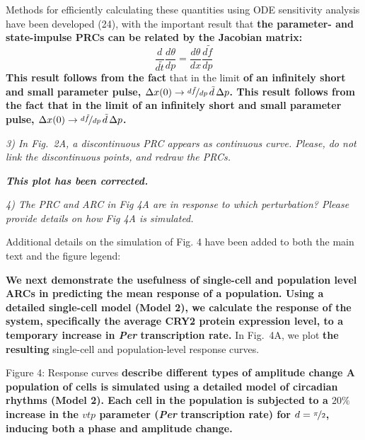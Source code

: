 \documentclass[11pt, letterpaper]{article}
\newenvironment{reviewer}{\itshape\color{gray}}{}
\newenvironment{manuscript}[1]{\begin{center}\begin{tcolorbox}[colback=green!5!white,colframe=green!75!black,width=0.8\textwidth,title={#1},breakable,fonttitle=\bfseries]}{\end{tcolorbox}\end{center}}
\begin{document}
\begin{manuscript}{Page 5}
  Methods for efficiently calculating these quantities using ODE sensitivity analysis have been developed (24), with the important result that {\bfseries the parameter- and state-impulse PRCs can be related by the Jacobian matrix:}
\begin{equation}
  \frac{d}{d\tilde{t}}\frac{d\theta}{dp} = \frac{d\theta}{dx}\frac{d\tilde{f}}{dp} 
  \tag{11}
\end{equation}
{\bfseries This result follows from the fact} that in the limit {\bfseries of an infinitely short and small parameter pulse, $\Delta x(0) \to \nicefrac{d\tilde{f}}{dp}\,\tilde{d}\, \Delta p$.
This result follows from the fact that in the limit of an infinitely short and small parameter pulse, $\Delta x(0) \to \nicefrac{d\tilde{f}}{dp}\,\tilde{d}\, \Delta p$.}
\end{manuscript}

\begin{reviewer}
3) In Fig.~2A, a discontinuous PRC appears as continuous curve.
Please, do not link the discontinuous points, and redraw the PRCs.
\end{reviewer}

{\bfseries\itshape This plot has been corrected.}

\begin{reviewer}
4) The PRC and ARC in Fig 4A are in response to which perturbation?
Please provide details on how Fig 4A is simulated.
\end{reviewer}

Additional details on the simulation of Fig. 4 have been added to both the main text and the figure legend:

\begin{manuscript}{Page 14}
{\bfseries We next demonstrate the usefulness of single-cell and population level ARCs in predicting the mean response of a population.
  Using a detailed single-cell model (Model 2), we calculate the response of the system, specifically the average CRY2 protein expression level, to a temporary increase in {\itshape Per} transcription rate.}
In Fig.~4A, we plot {\bfseries the resulting} single-cell and population-level response curves.
\end{manuscript}

\begin{manuscript}{Page 15}
  Figure 4: Response curves {\bfseries describe different types of amplitude change
A population of cells is simulated using a detailed model of circadian rhythms (Model 2).
Each cell in the population is subjected to a $20\%$ increase in the $\mathit{vtp}$ parameter ({\itshape Per} transcription rate) for $d=\nicefrac{\pi}{2}$, inducing both a phase and amplitude change.}
\end{manuscript}
\end{document}
